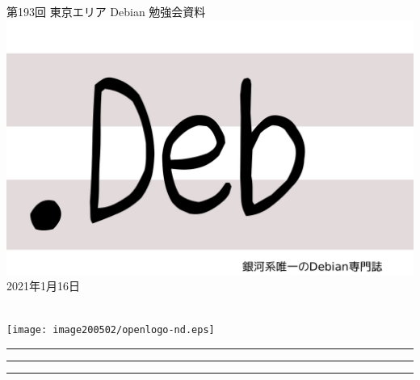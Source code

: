 \documentclass[mingoth,a4paper]{jsarticle}
\newcommand{\debmtgyear}{2021}
\newcommand{\debmtgmonth}{1}
\newcommand{\debmtgdate}{16}
\newcommand{\debmtgnumber}{193}
\begin{document}
\begin{titlepage}
\thispagestyle{empty}

\vspace*{-2cm}
第\debmtgnumber{}回 東京エリア Debian 勉強会資料\\
\hspace*{-2cm}
\includegraphics{image2012-natsu/dotdeb.pdf}\\
\hfill{}\debmtgyear{}年\debmtgmonth{}月\debmtgdate{}日

\\

\vspace*{-2cm}
\hfill{}\texttt{[image: image200502/openlogo-nd.eps]}
\end{titlepage}

\newpage

\begin{minipage}[b]{0.2\hsize}
 \colorbox{titleback}{}
\end{minipage}
\begin{minipage}[b]{0.8\hsize}
\hrule
\vspace{2mm}
\hrule
\begin{multicols}{2}
\tableofcontents
\end{multicols}
\vspace{2mm}
\hrule
\end{minipage}

\end{document}
